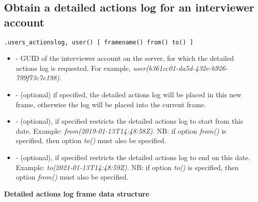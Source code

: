 \subsection{Obtain a detailed actions log for an interviewer account}
\begin{lstlisting}[style=CommandLineStyle]
.users_actionslog, user() [ framename() from() to() ]
\end{lstlisting}

\optsheader
\begin{itemize}
      \item {} - GUID of the interviewer account on the server, for which the detailed actions log is requested. For example, \textit{user(b361cc01-da5d-432e-b926-799f73c7e198)}.
      \item {} - (optional) if specified, the detailed actions log will be placed in this new frame, otherwise the log will be placed into the current frame.
      \item {} - (optional), if specified restricts the detailed actions log to start from this date. Example: \textit{from(2019-01-13T14:48:58Z)}. NB: if option \textit{from()} is specified, then option \textit{to()} must also be specified.
      \item {} - (optional), if specified restricts the detailed actions log to end on this date. Example: \textit{to(2021-01-13T14:48:59Z)}. NB: if option \textit{to()} is specified, then option \textit{from()} must also be specified.
\end{itemize}

\textbf{Detailed actions log frame data structure}

\begin{compactitem}
\end{compactitem}
